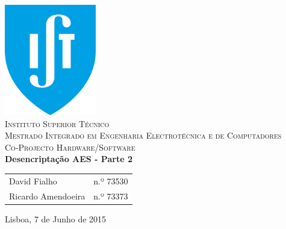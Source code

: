 \begin{titlepage}
	\begin{center}
		\hfill \break
		\hfill \break
		\includegraphics[width=0.3\textwidth]{./logo}~\\[1cm]
		\textsc{\LARGE Instituto Superior Técnico}\\[0.25cm]
		\textsc{\Large Mestrado Integrado em Engenharia Electrotécnica e de Computadores}\\[1.8cm]
		\textsc{\huge Co-Projecto Hardware/Software}\\[0.25cm]
		{\huge \bfseries  Desencriptação AES - Parte 2\\[1cm]}
		\begin{tabular}{ l l }
			David Fialho & \hspace{2mm} n.º 73530 \\
			Ricardo Amendoeira & \hspace{2mm} n.º 73373 \\
		\end{tabular}
		\vfill
		{\large Lisboa, 7 de Junho de 2015}
	\end{center}
\end{titlepage}
\pagebreak